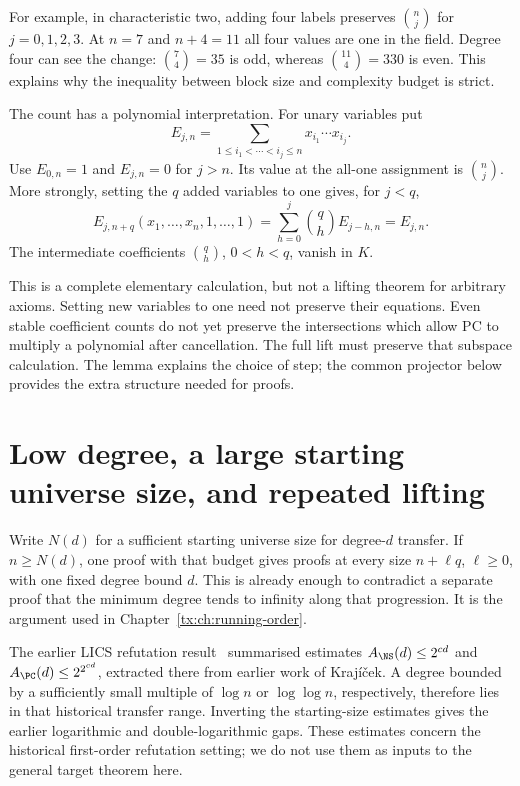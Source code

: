 For example, in characteristic two, adding four labels preserves
$\binom nj$ for $j=0,1,2,3$. At $n=7$ and $n+4=11$ all four values
are one in the field. Degree four can see the change:
$\binom74=35$ is odd, whereas $\binom{11}4=330$ is even.
This explains why the inequality between block size and complexity
budget is strict.

The count has a polynomial interpretation. For unary variables put
\[
 E_{j,n}=\sum_{1\le i_1<\cdots<i_j\le n}
                           x_{i_1}\cdots x_{i_j}.
\]
Use $E_{0,n}=1$ and $E_{j,n}=0$ for $j>n$.
Its value at the all-one assignment is $\binom nj$.
More strongly, setting the $q$ added variables to one gives, for $j<q$,
\[
 E_{j,n+q}(x_1,\ldots,x_n,1,\ldots,1)
   =\sum_{h=0}^j\binom qh E_{j-h,n}=E_{j,n}.
\]
The intermediate coefficients $\binom qh$, $0<h<q$, vanish in $K$.

This is a complete elementary calculation, but not a lifting theorem
for arbitrary axioms. Setting new variables to one need not preserve
their equations. Even stable coefficient counts do not yet preserve
the intersections which allow PC to multiply a polynomial after
cancellation. The full lift must preserve that subspace calculation.
The lemma explains the choice of step; the common projector below
provides the extra structure needed for proofs.

\section{Low degree, a large starting universe size, and repeated lifting}
Write $N(d)$ for a sufficient starting universe size for degree-$d$ transfer.
If $n\ge N(d)$, one proof with that budget gives proofs at every
size $n+\ell q$, $\ell\ge0$, with one fixed degree bound $d$.
This is already enough to contradict a separate proof that the
minimum degree tends to infinity along that progression. It is the
argument used in Chapter~\ref{tx:ch:running-order}.

The earlier LICS refutation result~\cite[p.~276]{Riis} summarised
estimates $A_{\NS}(d)\le2^{cd}$ and
$A_{\PC}(d)\le2^{2^{cd}}$, extracted there from earlier work of
Kraj\'i\v cek. A degree bounded by a sufficiently small multiple of
$\log n$ or $\log\log n$, respectively, therefore lies in that
historical transfer range. Inverting the starting-size estimates gives
the earlier logarithmic and double-logarithmic gaps.
These estimates concern the historical first-order refutation setting;
we do not use them as inputs to the general target theorem here.


